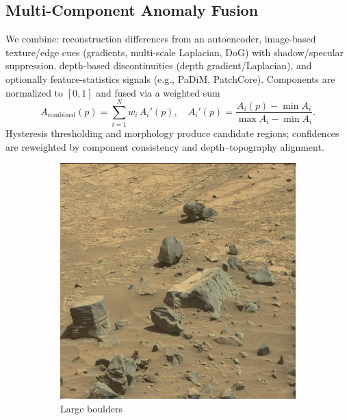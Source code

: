 \documentclass[12pt]{article}
\begin{document}
\subsection{Multi-Component Anomaly Fusion}
We combine: reconstruction differences from an autoencoder, image-based texture/edge cues (gradients, multi-scale Laplacian, DoG) with shadow/specular suppression, depth-based discontinuities (depth gradient/Laplacian), and optionally feature-statistics signals (e.g., PaDiM, PatchCore). Components are normalized to $[0,1]$ and fused via a weighted sum
\[ A_{\mathrm{combined}}(p) = \sum_{i=1}^N w_i\, A_i'(p), \quad A_i'(p)=\frac{A_i(p)-\min A_i}{\max A_i-\min A_i}. \]
Hysteresis thresholding and morphology produce candidate regions; confidences are reweighted by component consistency and depth–topography alignment.
\begin{figure}[H]
  \centering
  \begin{subfigure}[t]{0.49\textwidth}
    \centering
    \includegraphics[width=\linewidth]{curiosity_boulders.jpg}
    \caption{Large boulders}
  \end{subfigure}\hfill
  \begin{subfigure}[t]{0.49\textwidth}
    \centering

\end{subfigure}
\end{figure}
\end{document}
